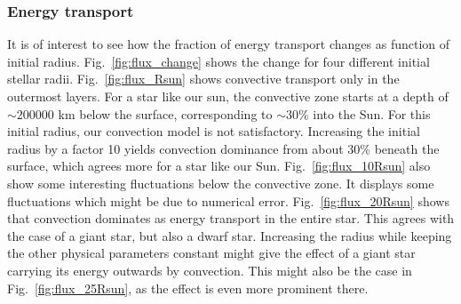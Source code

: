 \documentclass[a4paper, 11pt, english]{article}
\newcommand{\refig}[1]{\textcolor{blue}{\ref{fig:#1}}} %
\begin{document}
\subsubsection{Energy transport}
It is of interest to see how the fraction of energy transport changes as function of
initial radius. Fig.~\refig{flux_change} shows the change for four different initial
stellar radii. Fig.~\refig{flux_Rsun} shows convective transport only in the outermost
layers. For a star like our sun, the convective zone starts at a depth of $\sim 200
000$ km below the surface, corresponding to $\sim30\%$ into the Sun. For this initial radius, our convection model is not
satisfactory. Increasing the initial radius by a factor 10 yields convection dominance
from about 30\% beneath the surface, which agrees more for a star like our Sun.
Fig.~\refig{flux_10Rsun} also show some interesting fluctuations below the
convective zone. It displays some fluctuations which might be due to
numerical error. Fig.~\refig{flux_20Rsun} shows that
convection dominates as energy transport in the entire star. This agrees with the case of
a giant star, but also a dwarf star. Increasing the radius while keeping the other
physical parameters constant might give the effect of a giant star carrying its energy
outwards by convection.
This might also be the case in Fig.~\refig{flux_25Rsun}, as the effect is even
more prominent there.
\end{document}
